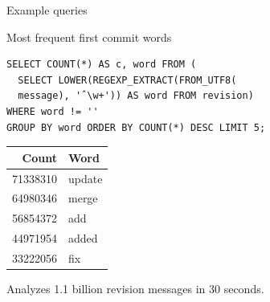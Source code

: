 \documentclass[aspectratio=169,xcolor=table]{beamer}
\begin{document}
    \begin{frame}[fragile]{Example queries}

        \begin{block}{Most frequent first commit words}
            \begin{verbatim}
SELECT COUNT(*) AS c, word FROM (
  SELECT LOWER(REGEXP_EXTRACT(FROM_UTF8(
  message), 'ˆ\w+')) AS word FROM revision)
WHERE word != ''
GROUP BY word ORDER BY COUNT(*) DESC LIMIT 5;
            \end{verbatim}

            \begin{center}
                \begin{tabular}{rl}
                    Count & Word\\
                    \hline
                    \num{71338310} & update\\
                    \num{64980346} & merge\\
                    \num{56854372} & add\\
                    \num{44971954} & added\\
                    \num{33222056} & fix\\
                \end{tabular}
            \end{center}
        \end{block}

        \begin{block}{}
            Analyzes 1.1 billion revision messages in 30 seconds.
        \end{block}
    \end{frame}
\end{document}
